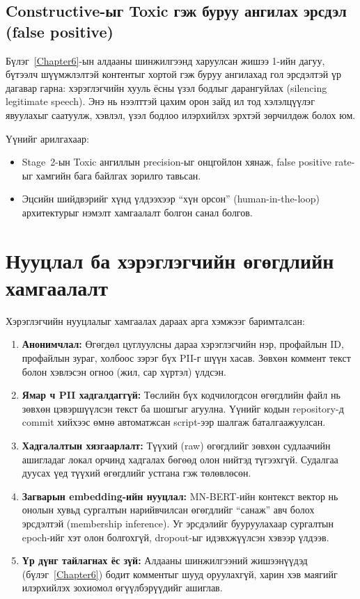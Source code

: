 \subsection{Constructive-ыг Toxic гэж буруу ангилах эрсдэл (false positive)}

Бүлэг~\ref{Chapter6}-ын алдааны шинжилгээнд харуулсан жишээ 1-ийн дагуу,
бүтээлч шүүмжлэлтэй контентыг хортой гэж буруу ангилахад гол эрсдэлтэй
үр дагавар гарна: хэрэглэгчийн хууль ёсны үзэл бодлыг дарангуйлах
(silencing legitimate speech). Энэ нь нээлттэй цахим орон зайд ил
тод хэлэлцүүлэг явуулахыг саатуулж, хэвлэл, үзэл бодлоо илэрхийлэх
эрхтэй зөрчилдөж болох юм.

Үүнийг арилгахаар:

\begin{itemize}
  \item Stage~2-ын Toxic ангиллын precision-ыг онцгойлон хянаж, false positive
    rate-ыг хамгийн бага байлгах зорилго тавьсан.
  \item Эцсийн шийдвэрийг хүнд үлдээхээр ``хүн орсон'' (human-in-the-loop)
    архитектурыг нэмэлт хамгаалалт болгон санал болгов.
\end{itemize}

\section{Нууцлал ба хэрэглэгчийн өгөгдлийн хамгаалалт}

Хэрэглэгчийн нууцлалыг хамгаалах дараах арга хэмжээг баримталсан:

\begin{enumerate}
  \item \textbf{Анонимчлал:} Өгөгдөл цуглуулсны дараа хэрэглэгчийн нэр,
    профайлын ID, профайлын зураг, холбоос зэрэг бүх PII-г шүүн хасав.
    Зөвхөн коммент текст болон хэвлэсэн огноо (жил, сар хүртэл) үлдсэн.
  \item \textbf{Ямар ч PII хадгалдаггүй:} Төслийн бүх кодчилогдсон өгөгдлийн
    файл нь зөвхөн цэвэршүүлсэн текст ба шошгыг агуулна. Үүнийг кодын
    repository-д commit хийхээс өмнө автоматжсан script-ээр шалгаж
    баталгаажуулсан.
  \item \textbf{Хадгалалтын хязгаарлалт:} Түүхий (raw) өгөгдлийг зөвхөн
    судлаачийн ашигладаг локал орчинд хадгалах бөгөөд олон нийтэд
    түгээхгүй. Судалгаа дуусах үед түүхий өгөгдлийг устгана гэж
    төлөвлөсөн.
  \item \textbf{Загварын embedding-ийн нууцлал:} MN-BERT-ийн контекст
    вектор нь онолын хувьд сургалтын нарийвчилсан өгөгдлийг ``санаж''
    авч болох эрсдэлтэй (membership inference). Уг эрсдэлийг бууруулахаар
    сургалтын epoch-ийг хэт олон болгохгүй, dropout-ыг идэвхжүүлсэн
    хэвээр үлдээв.
  \item \textbf{Үр дүнг тайлагнах ёс зүй:} Алдааны шинжилгээний жишээнүүдэд
    (бүлэг~\ref{Chapter6}) бодит комментыг шууд оруулахгүй, харин хэв
    маягийг илэрхийлэх зохиомол өгүүлбэрүүдийг ашиглав.
\end{enumerate}

